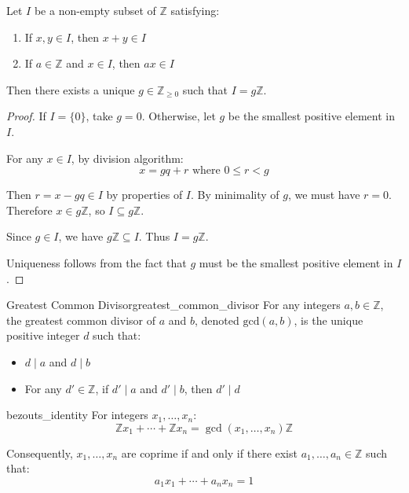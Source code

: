 \begin{lemma}
  Let $I$ be a non-empty subset of $\mathbb{Z}$ satisfying:
  \begin{enumerate}
    \item If $x,y \in I$, then $x + y \in I$
    \item If $a \in \mathbb{Z}$ and $x \in I$, then $ax \in I$
  \end{enumerate}
  Then there exists a unique $g \in \mathbb{Z}_{\geq 0}$ such that $I = g\mathbb{Z}$.
\end{lemma}

\begin{proof}
  If $I = \{0\}$, take $g = 0$. Otherwise, let $g$ be the smallest positive element in $I$.

  For any $x \in I$, by division algorithm:
  \[
    x = gq + r \text{ where } 0 \leq r < g
  \]

  Then $r = x - gq \in I$ by properties of $I$. By minimality of $g$, we must have $r = 0$.
  Therefore $x \in g\mathbb{Z}$, so $I \subseteq g\mathbb{Z}$.

  Since $g \in I$, we have $g\mathbb{Z} \subseteq I$. Thus $I = g\mathbb{Z}$.

  Uniqueness follows from the fact that $g$ must be the smallest positive element in $I$.
\end{proof}

\begin{definition}{Greatest Common Divisor}{greatest_common_divisor}
  For any integers $a,b \in \mathbb{Z}$, the greatest common divisor of $a$ and $b$, denoted $\text{gcd}(a,b)$, is the unique positive integer $d$ such that:
  \begin{itemize}
    \item $d \mid a$ and $d \mid b$
    \item For any $d' \in \mathbb{Z}$, if $d' \mid a$ and $d' \mid b$, then $d' \mid d$
  \end{itemize}
\end{definition}

\begin{proposition}{bezouts_identity}
  For integers $x_1,\ldots,x_n$:
  \[
    \mathbb{Z}x_1 + \cdots + \mathbb{Z}x_n = \gcd(x_1,\ldots,x_n)\mathbb{Z}
  \]

  Consequently, $x_1,\ldots,x_n$ are coprime if and only if there exist $a_1,\ldots,a_n \in \mathbb{Z}$ such that:
  \[
    a_1x_1 + \cdots + a_nx_n = 1
  \]
\end{proposition}


